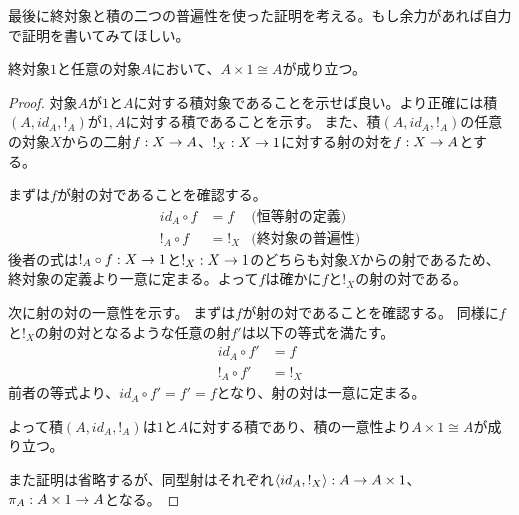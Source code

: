   最後に終対象と積の二つの普遍性を使った証明を考える。もし余力があれば自力で証明を書いてみてほしい。
  \begin{prop}[終対象との積]
    終対象$1$と任意の対象$A$において、$A\times 1\cong A$が成り立つ。
  \end{prop}
  \begin{proof}
    対象$A$が$1$と$A$に対する積対象であることを示せば良い。より正確には積$(A,id_A,!_A)$が$1,A$に対する積であることを示す。
    また、積$(A,id_A,!_A)$の任意の対象$X$からの二射$f:X\rightarrow A$、$!_X:X\rightarrow 1$に対する射の対を$f:X\rightarrow A$とする。
    
    \begin{center}
    \end{center}

    まずは$f$が射の対であることを確認する。
    \begin{align*}
      id_A\circ f &= f&\text{(恒等射の定義)}\\
      !_A\circ f &= !_X&\text{(終対象の普遍性)}
    \end{align*}
    後者の式は$!_A\circ f:X\rightarrow 1$と$!_X:X\rightarrow 1$のどちらも対象$X$からの射であるため、終対象の定義より一意に定まる。よって$f$は確かに$f$と$!_X$の射の対である。

    次に射の対の一意性を示す。
    まずは$f$が射の対であることを確認する。
    同様に$f$と$!_X$の射の対となるような任意の射$f'$は以下の等式を満たす。
    \begin{align*}
      id_A\circ f' &= f\\
      !_A\circ f' &= !_X
    \end{align*}
    前者の等式より、$id_A\circ f'=f'=f$となり、射の対は一意に定まる。

    よって積$(A,id_A,!_A)$は$1$と$A$に対する積であり、積の一意性より$A\times 1\cong A$が成り立つ。

    また証明は省略するが、同型射はそれぞれ$\langle id_A,!_X\rangle:A\rightarrow A\times 1$、$\pi_A:A\times 1\rightarrow A$となる。
  \end{proof}